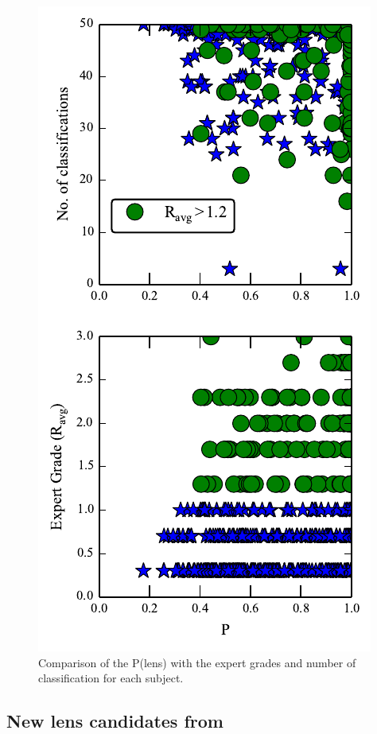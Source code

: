 \documentclass[useAMS,usenatbib,a4paper]{mn2e}
\begin{document}
\begin{figure}
\begin{center}
\includegraphics[scale=1.0]{sw-cfhtls-figs/poffl_expr_ncl.pdf}
\caption{ \label{fig:comp_exp} Comparison of the P(lens) with the expert
grades and number of classification for each subject.  }
\end{center}
\end{figure}



\subsection{New lens candidates from \sw}
\label{sec:results:disc}
\end{document}
